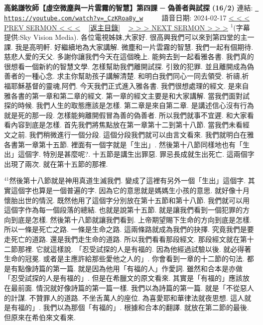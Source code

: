 \documentclass{book}
\begin{document}
\section{}
\label{sec:_CzKRoa8y_w}
\textbf{高銘謙牧師【虛空微塵與一片雲霧的智慧】第四課 ─ 偽善者與試探 (16/2)}
\newline
\newline
連結: \href{https://youtube.com/watch?v=_CzKRoa8y_w}{\texttt{ https://youtube.com/watch?v=\_CzKRoa8y\_w}} ~~~~ 語音日期: 2024-02-17 
\newline
\newline
\hyperref[sec:GvsPo_gDoyw]{\small{< < < PREV SERMON < < <}}
~
\hyperref[sec:index]{\small{[返主目錄]}}
~
\hyperref[sec:liEtjDNazis]{\small{> > > NEXT SERMON > > >}}
\newline
\newline
$^{1}$(字幕提供:Sky Vision Media).
各位電視姊妹,大家好.
很高興我們可以來到第四堂的主一課.
我是高明軒.
好繼續地為大家講解.
微塵和一片雲霧的智慧.
我們一起有個期待.
慈悲人愛的天父.
多謝你讓我們今天在這個晚上.
能夠去到一起看雅各書.
我們真的很想看一個新約的智慧文學.
怎樣幫助我們離開試探.
引致的犯罪.
並且離開成為偽善者的一種心念.
求主你幫助孩子講解清楚.
和明白我們同心一同去領受.
祈禱,祈福耶穌基督的靈魂,阿們.
今天我們正式進入雅各書.
我們很想處理的經文.
是來自雅各書的第一章和第二章的經文.
第一章的經文主要是和大家講解.
當我們面對試探的時候.
我們人生的取態應該是怎樣.
第二章是來自第二章.
是講述信心沒有行為就是死的那一段.
怎樣能夠離開假冒為善的偽善者.
所以我們就事不宜遲.
和大家看看內容到底是怎樣.
首先我們將焦點放在第一章第十二到第十八節.
當我們未看經文之前.
我們稍微進行一個分段.
這個分段我們就可以由言文看來.
我們就明白在雅各書第一章第十五節.
裡面有一個字就是「生出」.
然後第十八節同樣地也有「生出」這個字.
特別是甚麼呢?.
十五節是講生出罪惡.
罪忌長成就生出死亡.
這兩個字出現了兩次.
就在第十五節的那裡.

$^{41}$然後第十八節就是神用真道生滅我們.
變成了這裡有另外一個「生出」這個字.
其實這個字也算是一個普遍的字.
因為它的意思就是媽媽生小孩的意思.
就好像十月懷胎出世的情況.
既然他用了這個字分別放在第十五節和第十八節.
我們就可以用這個字作為每一個段落的總結.
也就是說第十五節.
就是讓我們看到一個犯罪的方向到底是怎樣.
然後第十八節就讓我們看到.
上帝期望賜下生命的方向到底是怎樣.
所以一條是死亡之路.
一條是生命之路.
這兩條路就成為我們的抉擇.
究竟我們是要走死亡的道路.
還是我們走生命的道路.
所以我們看看那段經文.
那段經文就在第十二節那裡.
它就這樣說.
「忍受試探的人是有福的.
因為他經過試驗以後.
就必得著生命的冠冕.
或者是主應許給那些愛他之人的」.
你會看到一章的十二節的句法.
都是有點像詩篇的第一篇.
就是因為他用「有福的人」作愛詞.
雖然和合本是亦做「忍受試探的人是有福的」.
但是在希臘文的原文看來.
其實是「有福的」應該放在最前面.
情況就好像詩篇的第一篇一樣.
我們以為詩篇的第一篇.
就是「不從惡人的計謀.
不贊罪人的道路.
不坐舌萬人的座位.
為喜愛耶和華律法就夜思想.
這人就是有福的」.
我們以為那個「有福的」.
根據和合本的翻譯.
就放在第二節的最後.
但原來在希伯來文看來.
\end{document}
